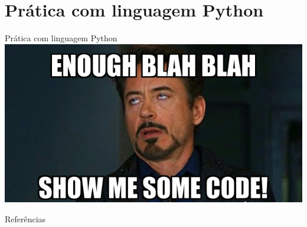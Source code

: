 \documentclass[aspectratio=169]{beamer}
\begin{document}
\section{Prática com linguagem Python}
\begin{frame}{Prática com linguagem Python}
    \centering
    \includegraphics[height=2.8in]{talkischeap.jpg}
\end{frame}

\begin{frame}{Referências}


\end{frame}
\end{document}
